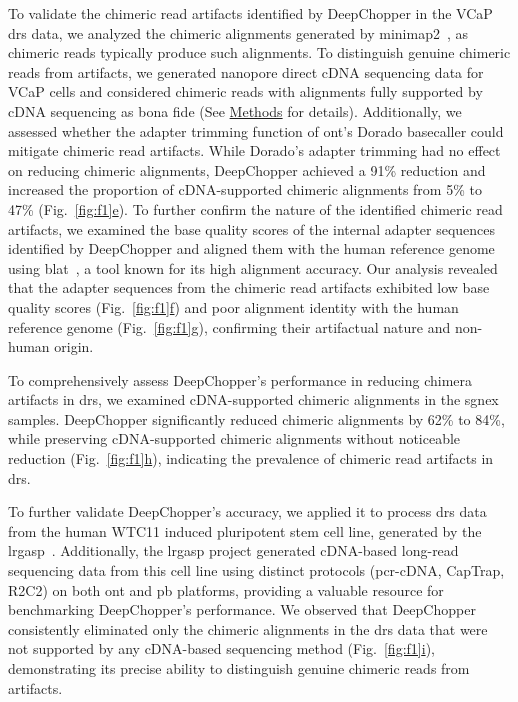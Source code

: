 \documentclass[pdflatex,sn-nature, lineno]{sn-jnl}%
\newcommand{\figref}[2]{Fig.~\hyperref[#1]{\ref*{#1}#2}}
\begin{document}
To validate the chimeric read artifacts identified by DeepChopper in the VCaP \gls{drs} data, we analyzed the chimeric alignments generated by minimap2~\cite{li2018minimap2}, as chimeric reads typically produce such alignments.
To distinguish genuine chimeric reads from artifacts, we generated nanopore direct cDNA sequencing data for VCaP cells and considered chimeric reads with alignments fully supported by cDNA sequencing as bona fide (See \hyperref[sec:methods]{Methods} for details).
Additionally, we assessed whether the adapter trimming function of \gls{ont}'s Dorado basecaller could mitigate chimeric read artifacts.
While Dorado's adapter trimming had no effect on reducing chimeric alignments, DeepChopper achieved a 91\% reduction and increased the proportion of cDNA-supported chimeric alignments from 5\% to 47\% (\figref{fig:f1}{e}).
To further confirm the nature of the identified chimeric read artifacts, we examined the base quality scores of the internal adapter sequences identified by DeepChopper and aligned them with the human reference genome using \gls{blat}~\cite{kent2002blat}, a tool known for its high alignment accuracy.
Our analysis revealed that the adapter sequences from the chimeric read artifacts exhibited low base quality scores (\figref{fig:f1}{f}) and poor alignment identity with the human reference genome (\figref{fig:f1}{g}), confirming their artifactual nature and non-human origin.

To comprehensively assess DeepChopper’s performance in reducing chimera artifacts in \gls{drs}, we examined cDNA-supported chimeric alignments in the \gls{sgnex} samples.
DeepChopper significantly reduced chimeric alignments by 62\% to 84\%, while preserving cDNA-supported chimeric alignments without noticeable reduction (\figref{fig:f1}{h}), indicating the prevalence of chimeric read artifacts in \gls{drs}.

To further validate DeepChopper's accuracy, we applied it to process \gls{drs} data from the human WTC11 induced pluripotent stem cell line, generated by the \gls{lrgasp}~\cite{pardo2024systematic}.
Additionally, the \gls{lrgasp} project generated cDNA-based long-read sequencing data from this cell line using distinct protocols (\gls{pcr}-cDNA, CapTrap, R2C2) on both \gls{ont} and \gls{pb} platforms, providing a valuable resource for benchmarking DeepChopper's performance.
We observed that DeepChopper consistently eliminated only the chimeric alignments in the \gls{drs} data that were not supported by any cDNA-based sequencing method (\figref{fig:f1}{i}), demonstrating its precise ability to distinguish genuine chimeric reads from artifacts.
\end{document}

